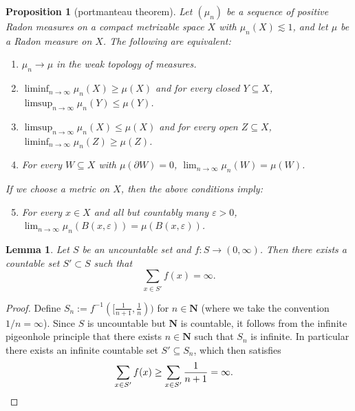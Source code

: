 \documentclass[reqno,11pt]{amsart}
\newcommand{\NN}{\mathbf{N}}
\newtheorem{lemma}[theorem]{Lemma}
\newtheorem{proposition}[theorem]{Proposition}
\theoremstyle{definition}
\numberwithin{equation}{section}
\begin{document}
\begin{proposition}[portmanteau theorem]\label{portmanteau}
	Let $(\mu_n)$ be a sequence of positive Radon measures on a compact metrizable space $X$ with $\mu_n(X) \lesssim 1$, and let $\mu$ be a Radon measure on $X$. The following are equivalent:
\begin{enumerate}
	\item $\mu_n \to \mu$ in the weak topology of measures.
	\item $\liminf_{n \to \infty} \mu_n(X) \geq \mu(X)$ and for every closed $Y \subseteq X$, $\limsup_{n \to \infty} \mu_n(Y) \leq \mu(Y)$.
	\item $\limsup_{n \to \infty} \mu_n(X) \leq \mu(X)$ and for every open $Z \subseteq X$, $\liminf_{n \to \infty} \mu_n(Z) \geq \mu(Z)$.
	\item For every $W \subseteq X$ with $\mu(\partial W) = 0$, $\lim_{n \to \infty} \mu_n(W) = \mu(W)$.
\end{enumerate}
	If we choose a metric on $X$, then the above conditions imply:
\begin{enumerate}
	\setcounter{enumi}{4}
	\item For every $x \in X$ and all but countably many $\varepsilon > 0$, $\lim_{n \to \infty} \mu_n(B(x, \varepsilon)) = \mu(B(x, \varepsilon))$.
\end{enumerate}
\end{proposition}

\begin{lemma}\label{cardinality appendix}
Let $S$ be an uncountable set and $f: S \to (0, \infty)$. Then there exists a countable set $S' \subset S$ such that
$$\sum_{x \in S'} f(x) = \infty.$$
\end{lemma}
\begin{proof}
Define $S_n := f^{-1}([\frac{1}{n + 1}, \frac{1}{n}))$ for $n \in \NN$ (where we take the convention $1/n = \infty$).
Since $S$ is uncountable but $\NN$ is countable, it follows from the infinite pigeonhole principle that there exists $n \in \NN$ such that $S_n$ is infinite.
In particular there exists an infinite countable set $S' \subseteq S_n$, which then satisfies
\begin{align*}
\sum_{x \in S'} f(x) &\geq \sum_{x \in S'} \frac{1}{n + 1} = \infty. \qedhere 
\end{align*}
\end{proof}
\end{document}
